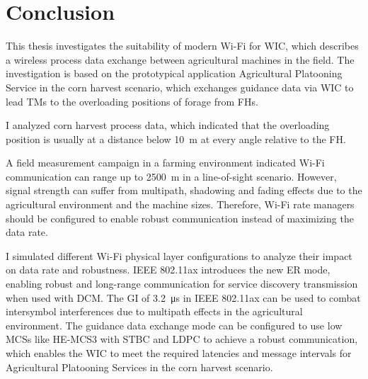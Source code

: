\chapter{Conclusion}
\acresetall
\begin{comment}
    \begin{itemize}
    \item summarize again what your paper did, but now emphasize more the results, and comparisons
    \item write conclusions that can be drawn from the results found and the discussion presented in the paper
    \item future work (be very brief, explain what, but not much how, do not speculate about results or impact)
    \item recommended length: one page.
    \end{itemize}
\end{comment}
This thesis investigates the suitability of modern Wi-Fi for \ac{WIC}, which describes a wireless process data exchange between agricultural machines in the field.
The investigation is based on the prototypical application Agricultural Platooning Service in the corn harvest scenario, which exchanges guidance data via \ac{WIC} to lead \acp{TM} to the overloading positions of forage from \acp{FH}.

I analyzed corn harvest process data, which indicated that the overloading position is usually at a distance below \SI{10}{\metre} at every angle relative to the \ac{FH}.

A field measurement campaign in a farming environment indicated Wi-Fi communication can range up to \SI{2500}{\metre} in a line-of-sight scenario.
However, signal strength can suffer from multipath, shadowing and fading effects due to the agricultural environment and the machine sizes.
Therefore, Wi-Fi rate managers should be configured to enable robust communication instead of maximizing the data rate.

I simulated different Wi-Fi physical layer configurations to analyze their impact on data rate and robustness.
IEEE 802.11ax introduces the new \ac{ER} mode, enabling robust and long-range communication for service discovery transmission when used with \ac{DCM}.
The \ac{GI} of \SI{3.2}{\micro\second} in IEEE 802.11ax can be used to combat intersymbol interferences due to multipath effects in the agricultural environment.
The guidance data exchange mode can be configured to use low \acp{MCS} like \ac{HE}-\ac{MCS}3 with \ac{STBC} and \ac{LDPC} to achieve a robust communication,
which enables the \ac{WIC} to meet the required latencies and message intervals for Agricultural Platooning Services in the corn harvest scenario.

